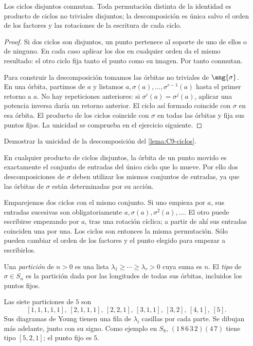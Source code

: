 \begin{lema}\label{lema:C9-ciclos}
Los ciclos disjuntos conmutan. Toda permutación distinta de la identidad es producto de ciclos no triviales disjuntos; la descomposición es única salvo el orden de los factores y las rotaciones de la escritura de cada ciclo.
\end{lema}
\begin{proof}
Si dos ciclos son disjuntos, un punto pertenece al soporte de uno de ellos o de ninguno. En cada caso aplicar los dos en cualquier orden da el mismo resultado: el otro ciclo fija tanto el punto como su imagen. Por tanto conmutan.

Para construir la descomposición tomamos las órbitas no triviales de $\ang{\sigma}$. En una órbita, partimos de $a$ y listamos $a,\sigma(a),\ldots,\sigma^{r-1}(a)$ hasta el primer retorno a $a$. No hay repeticiones anteriores: si $\sigma^i(a)=\sigma^j(a)$, aplicar una potencia inversa daría un retorno anterior. El ciclo así formado coincide con $\sigma$ en esa órbita. El producto de los ciclos coincide con $\sigma$ en todas las órbitas y fija sus puntos fijos. La unicidad se comprueba en el ejercicio siguiente.
\end{proof}
\begin{ejer}\label{ejer:C9-unicidad}
Demostrar la unicidad de la descomposición del \cref{lema:C9-ciclos}.
\end{ejer}
\begin{sol}
En cualquier producto de ciclos disjuntos, la órbita de un punto movido es exactamente el conjunto de entradas del único ciclo que lo mueve. Por ello dos descomposiciones de $\sigma$ deben utilizar los mismos conjuntos de entradas, ya que las órbitas de $\sigma$ están determinadas por su acción.

Emparejemos dos ciclos con el mismo conjunto. Si uno empieza por $a$, sus entradas sucesivas son obligatoriamente $a,\sigma(a),\sigma^2(a),\ldots$. El otro puede escribirse empezando por $a$, tras una rotación cíclica; a partir de ahí sus entradas coinciden una por una. Los ciclos son entonces la misma permutación. Sólo pueden cambiar el orden de los factores y el punto elegido para empezar a escribirlos.
\end{sol}

\begin{defi}
Una \emph{partición} de $n>0$ es una lista $\lambda_1\ge\cdots\ge\lambda_r>0$ cuya suma es $n$. El \emph{tipo} de $\sigma\in S_n$ es la partición dada por las longitudes de todas sus órbitas, incluidos los puntos fijos.
\end{defi}
Las siete particiones de $5$ son
\[
[1,1,1,1,1],\ [2,1,1,1],\ [2,2,1],\ [3,1,1],\ [3,2],\ [4,1],\ [5].
\]
Sus diagramas de Young tienen una fila de $\lambda_i$ casillas por cada parte. Se dibujan más adelante, junto con su signo. Como ejemplo en $S_8$, $(1\,8\,6\,3\,2)(4\,7)$ tiene tipo $[5,2,1]$; el punto fijo es $5$.


